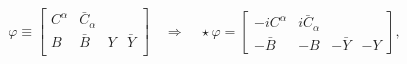 \begin{equation}
\label{3.4}
\varphi \equiv \begin{bmatrix}
C^\alpha & \bar{C}_\alpha & &
\\
B & \bar{B} & Y & \bar{Y}
\\
\end{bmatrix}
\quad \Rightarrow \quad
\star \varphi = \begin{bmatrix}
- i C^\alpha & i \bar{C}_\alpha & &
\\
- \bar{B} & - B & - \bar{Y} & - Y
\end{bmatrix},
\end{equation}

